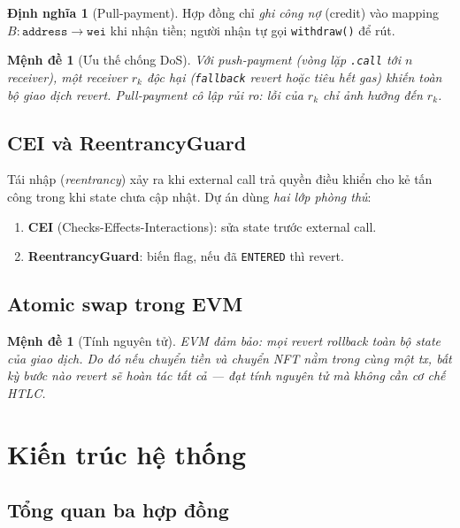 \documentclass[12pt,a4paper,oneside]{report}
\theoremstyle{plain}
\newtheorem{proposition}[theorem]{Mệnh đề}
\theoremstyle{definition}
\newtheorem{definition}[theorem]{Định nghĩa}
\theoremstyle{remark}
\begin{document}
\begin{definition}[Pull-payment]
Hợp đồng chỉ \emph{ghi công nợ} (credit) vào mapping $B: \texttt{address} \to \texttt{wei}$
khi nhận tiền; người nhận tự gọi \texttt{withdraw()} để rút.
\end{definition}

\begin{proposition}[Ưu thế chống DoS]\label{prop:pulldos}
Với push-payment (vòng lặp \texttt{.call} tới $n$ receiver), một receiver $r_k$ độc hại
(\texttt{fallback} revert hoặc tiêu hết gas) khiến toàn bộ giao dịch revert. Pull-payment cô
lập rủi ro: lỗi của $r_k$ chỉ ảnh hưởng đến $r_k$.
\end{proposition}

\section{CEI và ReentrancyGuard}

Tái nhập (\textit{reentrancy}) xảy ra khi external call trả quyền điều khiển cho kẻ tấn công
trong khi state chưa cập nhật. Dự án dùng \emph{hai lớp phòng thủ}:
\begin{enumerate}
  \item \textbf{CEI} (Checks-Effects-Interactions): sửa state trước external call.
  \item \textbf{ReentrancyGuard}: biến flag, nếu đã \texttt{ENTERED} thì revert.
\end{enumerate}

\section{Atomic swap trong EVM}

\begin{proposition}[Tính nguyên tử]\label{prop:atomic}
EVM đảm bảo: mọi revert rollback toàn bộ state của giao dịch. Do đó nếu chuyển tiền và chuyển
NFT nằm trong cùng một tx, bất kỳ bước nào revert sẽ hoàn tác tất cả — đạt tính nguyên tử
mà không cần cơ chế HTLC.
\end{proposition}

\chapter{Kiến trúc hệ thống}
\label{chap:arch}

\section{Tổng quan ba hợp đồng}
\end{document}

